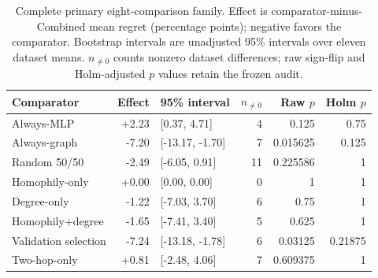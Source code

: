 \begin{table}[tbp]
\centering
\caption{Complete primary eight-comparison family. Effect is comparator-minus-Combined mean regret (percentage points); negative favors the comparator. Bootstrap intervals are unadjusted 95\% intervals over eleven dataset means. $n_{\ne0}$ counts nonzero dataset differences; raw sign-flip and Holm-adjusted $p$ values retain the frozen audit.}
\label{tab:primary_inference}
\small
\setlength{\tabcolsep}{3pt}
\begin{tabular}{@{}lrlrrr@{}}
\toprule
Comparator & Effect & 95\% interval & $n_{\ne0}$ & Raw $p$ & Holm $p$ \\
\midrule
Always-MLP & +2.23 & [0.37, 4.71] & 4 & 0.125 & 0.75 \\
Always-graph & -7.20 & [-13.17, -1.70] & 7 & 0.015625 & 0.125 \\
Random 50/50 & -2.49 & [-6.05, 0.91] & 11 & 0.225586 & 1 \\
Homophily-only & +0.00 & [0.00, 0.00] & 0 & 1 & 1 \\
Degree-only & -1.22 & [-7.03, 3.70] & 6 & 0.75 & 1 \\
Homophily+degree & -1.65 & [-7.41, 3.40] & 5 & 0.625 & 1 \\
Validation selection & -7.24 & [-13.18, -1.78] & 6 & 0.03125 & 0.21875 \\
Two-hop-only & +0.81 & [-2.48, 4.06] & 7 & 0.609375 & 1 \\
\bottomrule
\end{tabular}
\end{table}
